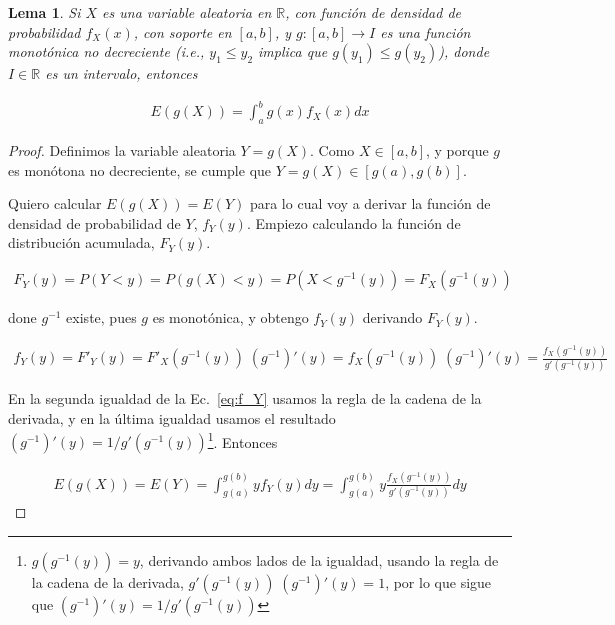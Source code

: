 \documentclass[10pt]{article}
\newtheorem{lema}{Lema}
\begin{document}
\begin{lema}

    Si $X$ es una variable aleatoria en $\mathbb{R}$, con función de densidad
    de probabilidad $f_X(x)$, con soporte en $[a, b]$, y $g:[a,
    b]\rightarrow I$ es una función monotónica no decreciente (i.e.,
    $y_1\le y_2$ implica que $g(y_1)\le g(y_2)$), donde $I\in\mathbb{R}$ es un
    intervalo, entonces

\begin{align*}
    E(g(X))=\int_a^bg(x)f_X(x)dx
\end{align*}

\end{lema}

\begin{proof}

    Definimos la variable aleatoria $Y=g(X)$. Como $X\in[a,b]$, y porque $g$ es
    monótona no decreciente, se cumple que $Y=g(X)\in[g(a),g(b)]$.

    Quiero calcular $E(g(X))=E(Y)$
    para lo cual voy a derivar la función de densidad de probabilidad de $Y$,
    $f_Y(y)$. Empiezo calculando la función de distribución acumulada,
    $F_Y(y)$.

    \begin{align*}
        F_Y(y)=P(Y<y)=P(g(X)<y)=P(X<g^{-1}(y))=F_X(g^{-1}(y))
    \end{align*}

    done $g^{-1}$ existe, pues $g$ es monotónica, y obtengo $f_Y(y)$ derivando
    $F_Y(y)$.

    \begin{align}
        f_Y(y)=F'_Y(y)=F'_X(g^{-1}(y))\;(g^{-1})'(y)=f_X(g^{-1}(y))\;(g^{-1})'(y)=\frac{f_X(g^{-1}(y))}{g'(g^{-1}(y))}\label{eq:f_Y}
    \end{align}

    En la segunda igualdad de la Ec.~\ref{eq:f_Y} usamos la regla de la cadena
    de la derivada, y en la última igualdad usamos el resultado
    $(g^{-1})'(y)=1/g'(g^{-1}(y))$\footnote{$g\left(g^{-1}(y)\right)=y$,
    derivando ambos lados de la igualdad, usando la regla de la cadena de la
    derivada, $g'\left(g^{-1}(y)\right)\;(g^{-1})'(y)=1$, por lo que sigue que
    $(g^{-1})'(y)=1/g'\left(g^{-1}(y)\right)$}.  Entonces

    \begin{align*}
        E(g(X))=E(Y)=\int_{g(a)}^{g(b)}yf_Y(y)dy=\int_{g(a)}^{g(b)}y\frac{f_X(g^{-1}(y))}{g'(g^{-1}(y))}dy\label{eq:EgX}
    \end{align*}


\end{proof}
\end{document}
